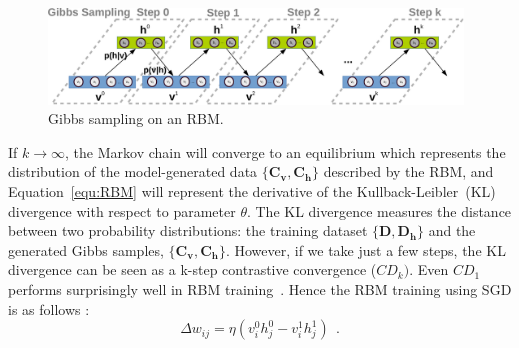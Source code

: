 \begin{figure}[hbt]
	\centering
	\includegraphics[width=0.98\textwidth]{pics_sdlm/gibbs_sampling.pdf}
	\caption{Gibbs sampling on an RBM.}
	\label{fig:gibbs}
\end{figure}

If $ k \to \infty $, the Markov chain will converge to an equilibrium which represents the distribution of the model-generated data $\{\mathbf{C_v}, \mathbf{C_h}\}$ described by the RBM, and Equation~\ref{equ:RBM} will represent the derivative of the Kullback-Leibler~(KL) divergence with respect to parameter $\theta$.
The KL divergence measures the distance between two probability distributions: the training dataset $\{\mathbf{D}, \mathbf{D_h}\}$ and the generated Gibbs samples, $\{\mathbf{C_v}, \mathbf{C_h}\}$.
However, if we take just a few steps, the KL divergence can be seen as a k-step contrastive convergence ($ {CD}_{k}) $.
Even $ {CD}_1 $ performs surprisingly well in RBM training~\citep{hinton2002training}.
Hence the RBM training using SGD is as follows :
\begin{equation}
\Delta w_{ij} = \eta (v^0_i h^0_j-v^1_i h^1_j)~~.
\label{equ:rbm_train}
\end{equation}



